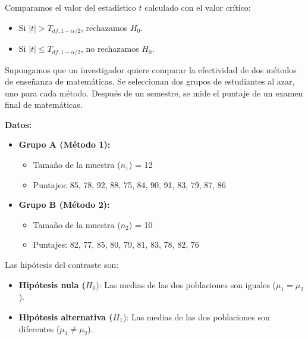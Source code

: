 \documentclass[
  letterpaper,
  DIV=11,
  numbers=noendperiod]{scrreprt}
\providecommand{\tightlist}{%
  \setlength{\itemsep}{0pt}\setlength{\parskip}{0pt}}\usepackage{longtable,booktabs,array}
\begin{document}
Comparamos el valor del estadístico \(t\) calculado con el valor
crítico:

\begin{itemize}
\tightlist
\item
  Si \(|t| > T_{df,1-\alpha/2}\), rechazamos \(H_0\).
\item
  Si \(|t| \leq T_{df,1-\alpha/2}\), no rechazamos \(H_0\).
\end{itemize}

\begin{tcolorbox}[enhanced jigsaw, arc=.35mm, breakable, coltitle=black, left=2mm, opacityback=0, bottomtitle=1mm, colbacktitle=quarto-callout-tip-color!10!white, title=\textcolor{quarto-callout-tip-color}{\faLightbulb}\hspace{0.5em}{Ejemplo Práctico. Contraste de hipótesis igualdad de medias}, titlerule=0mm, colback=white, colframe=quarto-callout-tip-color-frame, bottomrule=.15mm, rightrule=.15mm, opacitybacktitle=0.6, toptitle=1mm, toprule=.15mm, leftrule=.75mm]

Supongamos que un investigador quiere comparar la efectividad de dos
métodos de enseñanza de matemáticas. Se seleccionan dos grupos de
estudiantes al azar, uno para cada método. Después de un semestre, se
mide el puntaje de un examen final de matemáticas.

\textbf{Datos:}

\begin{itemize}
\tightlist
\item
  \textbf{Grupo A (Método 1):}

  \begin{itemize}
  \tightlist
  \item
    Tamaño de la muestra (\(n_1\)) = 12
  \item
    Puntajes: 85, 78, 92, 88, 75, 84, 90, 91, 83, 79, 87, 86
  \end{itemize}
\item
  \textbf{Grupo B (Método 2):}

  \begin{itemize}
  \tightlist
  \item
    Tamaño de la muestra (\(n_2\)) = 10
  \item
    Puntajes: 82, 77, 85, 80, 79, 81, 83, 78, 82, 76
  \end{itemize}
\end{itemize}

Las hipótesis del contraste son:

\begin{itemize}
\tightlist
\item
  \textbf{Hipótesis nula (}\(H_0\)): Las medias de las dos poblaciones
  son iguales (\(\mu_1=\mu_2\)).
\item
  \textbf{Hipótesis alternativa (}\(H_1\)): Las medias de las dos
  poblaciones son diferentes (\(\mu_1 \neq \mu_2\)).
\end{itemize}


\end{tcolorbox}
\end{document}
